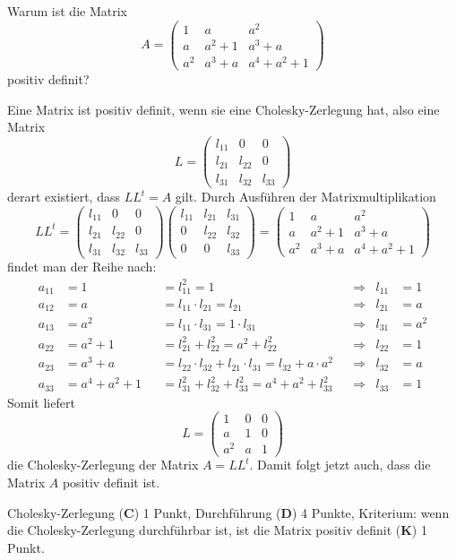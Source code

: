 Warum ist die Matrix
\[
A
=
\begin{pmatrix}
1&a&a^2\\
a&a^2+1&a^3+a\\
a^2&a^3+a&a^4+a^2+1
\end{pmatrix}
\]
positiv definit?


\begin{loesung}
Eine Matrix ist positiv definit, wenn sie eine Cholesky-Zerlegung hat,
also eine Matrix
\[
L
=
\begin{pmatrix}
l_{11}&0&0\\
l_{21}&l_{22}&0\\
l_{31}&l_{32}&l_{33}
\end{pmatrix}
\]
derart existiert, dass $LL^t=A$ gilt.
Durch Ausführen der Matrixmultiplikation
\[
LL^t
=
\begin{pmatrix}
l_{11}&0&0\\
l_{21}&l_{22}&0\\
l_{31}&l_{32}&l_{33}
\end{pmatrix}
\begin{pmatrix}
l_{11}&l_{21}&l_{31}\\
0&l_{22}&l_{32}\\
0&0&l_{33}
\end{pmatrix}
=
\begin{pmatrix}
1&a&a^2\\
a&a^2+1&a^3+a\\
a^2&a^3+a&a^4+a^2+1
\end{pmatrix}
\]
findet man der Reihe nach:
\begin{align*}
a_{11}&=1&
&=
l_{11}^2 =1
&&\Rightarrow&
l_{11}&=1\\
a_{12}&=a&
&=
l_{11}\cdot l_{21}
=
l_{21}
&&\Rightarrow&
l_{21}&=a\\
a_{13}&=a^2&
&=
l_{11}\cdot l_{31}=1\cdot l_{31}
&&\Rightarrow&
l_{31}&=a^2\\
a_{22}&=a^2+1&
&=
l_{21}^2 + l_{22}^2=a^2 + l_{22}^2
&&\Rightarrow&
l_{22}&=1\\
a_{23}&=a^3+a&
&=
l_{22}\cdot l_{32} + l_{21}\cdot l_{31} 
=
l_{32} + a\cdot a^2
&&\Rightarrow&
l_{32}&=a\\
a_{33}&=a^4+a^2+1&
&=
l_{31}^2 + l_{32}^2 + l_{33}^2=a^4+a^2+l_{33}^2
&&\Rightarrow&
l_{33}&=1
\end{align*}
Somit liefert
\[
L=\begin{pmatrix}
1&0&0\\
a&1&0\\
a^2&a&1
\end{pmatrix}
\]
die Cholesky-Zerlegung der Matrix $A=LL^t$.
Damit folgt jetzt auch, dass die Matrix $A$ positiv definit ist.
\end{loesung}

\begin{bewertung}
Cholesky-Zerlegung ({\bf C}) 1 Punkt,
Durchführung ({\bf D}) 4 Punkte,
Kriterium: wenn die Cholesky-Zerlegung durchführbar ist, ist die
Matrix positiv definit ({\bf K}) 1 Punkt.
\end{bewertung}
